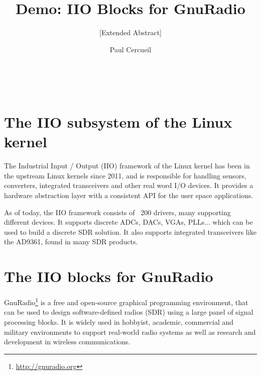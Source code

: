 \documentclass{acm_proc_article-sp}
\begin{document}
\title{Demo: IIO Blocks for GnuRadio}
\subtitle{[Extended Abstract]}


\author{
\alignauthor
Paul Cercueil\\
	\\
	\\
	\\
}

\maketitle



\section{The IIO subsystem of the Linux kernel}

The Industrial Input / Output (IIO) framework of the Linux kernel has been in
the upstream Linux kernels since 2011, and is responsible for handling sensors,
converters, integrated transceivers and other real word I/O devices. It provides
a hardware abstraction layer with a consistent API for the user space
applications.

As of today, the IIO framework consists of ~200 drivers, many supporting
different devices. It supports discrete ADCs, DACs, VGAs, PLLs... which
can be used to build a discrete SDR solution. It also supports integrated
transceivers like the AD9361, found in many SDR products.

\section{The IIO blocks for GnuRadio}

GnuRadio\footnote{ \url{http://gnuradio.org}}
is a free and open-source graphical programming environment, that can
be used to design software-defined radios (SDR) using a large panel of signal
processing blocks. It is widely used in hobbyist, academic, commercial and
military environments to support real-world radio systems as well as research
and development in wireless communications.
\end{document}
